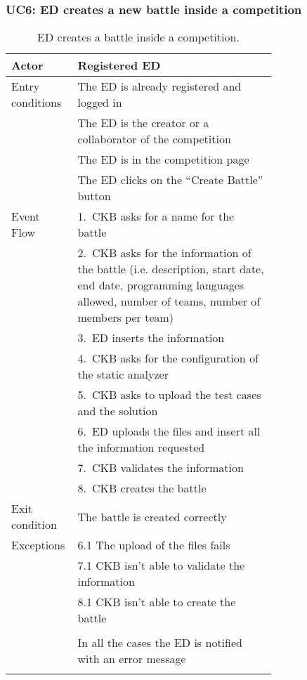 \subsubsection*{UC6: ED creates a new battle inside a competition}
\begin{center}
  \begin{longtable}{l|p{0.75\linewidth}}
    \hline
    Actor & Registered ED \\
    \hline
    Entry conditions & The ED is already registered and logged in  \\
    & The ED is the creator or a collaborator of the competition \\
    & The ED is in the competition page \\
    & The ED clicks on the “Create Battle” button \\
    \hline
    Event Flow & 1.\ CKB asks for a name for the battle \\
    & 2.\ CKB asks for the information of the battle (i.e. description, start date, end date, programming languages allowed, number of teams, number of members per team) \\
    & 3.\ ED inserts the information \\
    & 4.\ CKB asks for the configuration of the static analyzer \\
    & 5.\ CKB asks to upload the test cases and the solution \\
    & 6.\ ED uploads the files and insert all the information requested \\
    & 7.\ CKB validates the information \\
    & 8.\ CKB creates the battle \\
    \hline
    Exit condition & The battle is created correctly \\
    \hline
    Exceptions & 6.1 The upload of the files fails \\
    & 7.1 CKB isn’t able to validate the information \\
    & 8.1 CKB isn’t able to create the battle \\ \\
    & In all the cases the ED is notified with an error message \\
    \hline
    \caption{ED creates a battle inside a competition.}
    \label{tab: ED_create_battle}
  \end{longtable}
\end{center}

